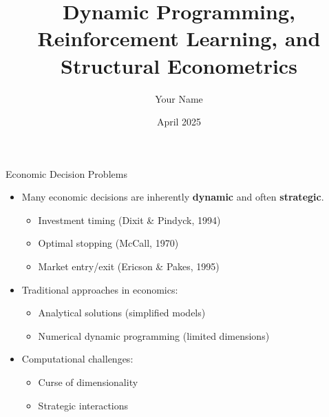 \documentclass[10pt]{beamer}
\title{Dynamic Programming, Reinforcement Learning, and Structural Econometrics}
\date{April 2025}
\author{Your Name}
\institute{University Department}
\begin{document}
\maketitle


\begin{frame}{Economic Decision Problems}
    \begin{itemize}
        \item Many economic decisions are inherently \textbf{dynamic} and often \textbf{strategic}. 
        \begin{itemize}
            \item Investment timing (Dixit \& Pindyck, 1994)
            \item Optimal stopping (McCall, 1970)
            \item Market entry/exit (Ericson \& Pakes, 1995)
        \end{itemize}
        \vspace{0.2cm}
        \item Traditional approaches in economics:
        \begin{itemize}
            \item Analytical solutions (simplified models)
            \item Numerical dynamic programming (limited dimensions)
        \end{itemize}
        \vspace{0.2cm}
        \item Computational challenges:
        \begin{itemize}
            \item Curse of dimensionality
            \item Strategic interactions
        \end{itemize}
    \end{itemize}
\end{frame}

\end{document}
